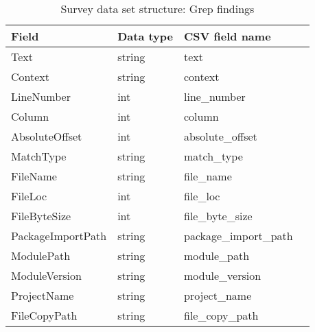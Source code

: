 \begin{table}[h]
    \centering
    \caption{Survey data set structure: Grep findings}
    \label{tbl:datastructure-grep-findings}
    \begin{tabular}{llll}
        \toprule
        Field & Data type & CSV field name \\
        \midrule
        Text                 & string & text \\
        Context              & string & context \\
        LineNumber           & int    & line\_number \\
        Column               & int    & column \\
        AbsoluteOffset       & int    & absolute\_offset \\
        MatchType            & string & match\_type \\
        FileName             & string & file\_name \\
        FileLoc              & int    & file\_loc \\
        FileByteSize         & int    & file\_byte\_size \\
        PackageImportPath    & string & package\_import\_path \\
        ModulePath           & string & module\_path \\
        ModuleVersion        & string & module\_version \\
        ProjectName          & string & project\_name \\
        FileCopyPath         & string & file\_copy\_path \\
        \bottomrule
    \end{tabular}
\end{table}

